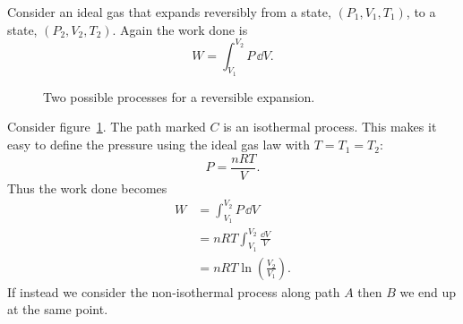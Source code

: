 \documentclass[a4paper]{article}
\begin{document}
    \begin{example}\label{exa:reversible ideal gas expansion}
        Consider an ideal gas that expands reversibly from a state, \((P_1, V_1, T_1)\), to a state, \((P_2, V_2, T_2)\).
        Again the work done is
        \[W = \int_{V_1}^{V_2}P\,\dd{V}.\]
        \begin{figure}[ht]
            \centering
            \caption{Two possible processes for a reversible expansion.}
            \label{fig:reversible ideal gas expansion}
        \end{figure}
        Consider figure~\ref{fig:reversible ideal gas expansion}.
        The path marked \(C\) is an isothermal process.
        This makes it easy to define the pressure using the ideal gas law with \(T = T_1 = T_2\):
        \[P = \frac{nRT}{V}.\]
        Thus the work done becomes
        \begin{align*}
            W &= \int_{V_1}^{V_2}P\,\dd{V}\\
            &= nRT\int_{V_1}^{V_2}\frac{\dd{V}}{V}\\
            &= nRT\ln\left(\frac{V_2}{V_1}\right).
        \end{align*}
        If instead we consider the non-isothermal process along path \(A\) then \(B\) we end up at the same point.

\end{example}
\end{document}
